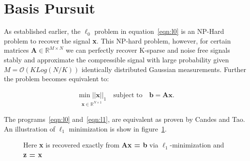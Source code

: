 \documentclass[titlepage,oneside, 12pt]{book}
\theoremstyle{break}
\begin{document}
\newpage
\section{Basis Pursuit}\label{BP-Intro}
As established earlier, the $\ell_{0}$ problem in equation~\ref{eqn:l0} is an NP-Hard problem to recover the signal \textbf{x}. This NP-hard problem, however, for certain matrices\cite{UPSR} $\textbf{A} \in \mathbb{R}^{M \times N}$ we can perfectly recover K-sparse and noise free signals stably and approximate the compressible signal with large probability given $M = \mathcal{O}(KLog(N/K))$ identically distributed Gaussian measurements. Further the problem becomes equivalent to:

\begin{equation}
\begin{gathered}
\underset{\textbf{x} \in \mathbb{R}^{N \times 1}}{\min ||\textbf{x}||_{1}} \quad \text{subject to} \quad \textbf{b} = \textbf{Ax}. 
\end{gathered}
\label{eqn:l1}
\end{equation}


The programs~\ref{eqn:l0} and~\ref{eqn:l1}, are equivalent as proven by Candes and Tao\cite{delin}. An illustration of $\ell_{1}$ minimization is show in figure~\ref{fig:L1Tik}.

\begin{figure}[H]
\centering
{}
\caption{Here \textbf{x} is recovered exactly from \textbf{Ax = b} via $\ell_{1}$-minimization and \textbf{z = x}}
\label{fig:L1Tik}
\end{figure}
\end{document}
